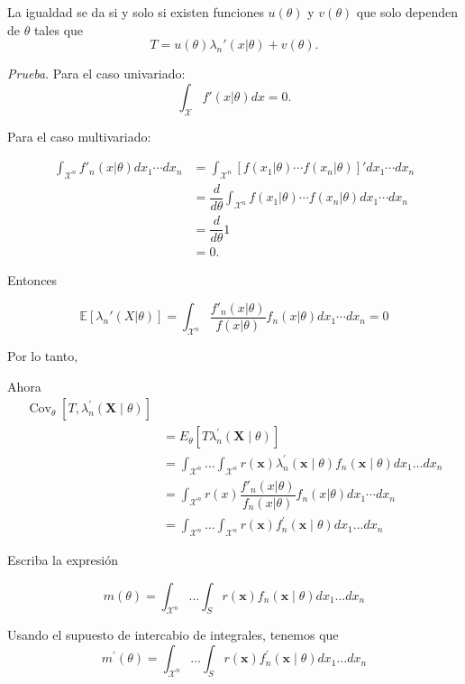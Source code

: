 \documentclass[
  12pt,
]{book}
\begin{document}
La igualdad se da si y solo si existen funciones \(u(\theta)\) y \(v(\theta)\) que solo dependen de \(\theta\) tales que
\[T = u(\theta)\lambda_n'(x|\theta) + v(\theta).\]

\emph{Prueba}. Para el caso univariado:
\[\int_{\mathcal X}f'(x|\theta)dx = 0.\]

Para el caso multivariado:

\begin{align*}
\int_{\mathcal X^n}f'_n(x|\theta)dx_1\cdots dx_n & =\int_{\mathcal X^n}[f(x_1|\theta)\cdots f(x_n|\theta)]'dx_1\cdots dx_n \\
& = \dfrac d{d\theta} \int_{\mathcal X^n}f(x_1|\theta)\cdots f(x_n|\theta)dx_1\cdots dx_n \\
&= \dfrac d{d\theta} 1 \\
&= 0.
\end{align*}

Entonces

\[\mathbb E[\lambda_n'(X|\theta)] = \int_{\mathcal X^n}\dfrac{f'_n(x|\theta)}{f(x|\theta)} f_{n}(x\vert \theta)dx_1\cdots dx_n = 0\]

Por lo tanto,

Ahora
\begin{align*}
\operatorname{Cov}_{\theta}\left[T, \lambda_{n}^{\prime}(\boldsymbol{X} \mid
\theta)\right] \\
&=E_{\theta}\left[T \lambda_{n}^{\prime}(\boldsymbol{X} \mid \theta)\right] \\
&=\int_{\mathcal{X}^n} \ldots \int_{\mathcal{X}^n} r(\boldsymbol{x}) \lambda_{n}^{\prime}(\boldsymbol{x} \mid \theta) f_{n}(\boldsymbol{x} \mid \theta) d x_{1} \ldots d x_{n} \\
& =\int_{\mathcal X^n}r(x)\dfrac{f'_n(x|\theta)}{f_n(x|\theta)}f_n(x|\theta)dx_1\cdots dx_n\\
&=\int_{\mathcal{X}^n} \ldots \int_{\mathcal{X}^n} r(\boldsymbol{x}) f_{n}^{\prime}(\boldsymbol{x} \mid \theta) d x_{1} \ldots d x_{n}
\end{align*}

Escriba la expresión

\begin{equation*}
m(\theta)=\int_{\mathcal{X}^n} \ldots \int_{S} r(\boldsymbol{x}) f_{n}(\boldsymbol{x} \mid \theta) d x_{1} \ldots d x_{n}
\end{equation*}

Usando el supuesto de intercabio de integrales, tenemos que
\begin{equation*}
m^{\prime}(\theta)=\int_{\mathcal{X}^n} \ldots \int_{S} r(\boldsymbol{x}) f_{n}^{\prime}(\boldsymbol{x} \mid \theta) d x_{1} \ldots d x_{n}
\end{equation*}
\end{document}
